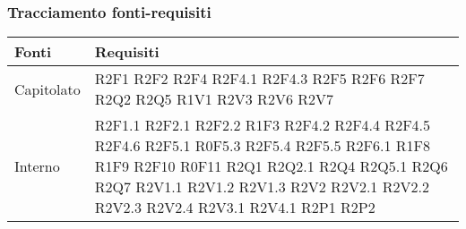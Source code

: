 \subsubsection{Tracciamento fonti-requisiti}
\begin{center}
	\centering
	\renewcommand{\arraystretch}{1.5}
	\begin{longtable}{  p{5cm} p{5cm} }
		\rowcolor{tableHeadYellow}
		\textbf{Fonti} & \textbf{Requisiti} \\
		\endhead  
		
		Capitolato & R2F1 \newline R2F2 \newline R2F4 \newline R2F4.1 \newline R2F4.3 \newline R2F5 \newline R2F6 \newline R2F7 \newline R2Q2 \newline R2Q5 \newline R1V1 \newline R2V3 \newline R2V6 \newline
					R2V7 \\
		Interno & R2F1.1 \newline R2F2.1 \newline R2F2.2 \newline R1F3 \newline R2F4.2 \newline R2F4.4 \newline R2F4.5 \newline R2F4.6 \newline R2F5.1 \newline R0F5.3 \newline R2F5.4 \newline R2F5.5 \newline R2F6.1 \newline R1F8 \newline R1F9 \newline R2F10 \newline R0F11 \newline R2Q1 \newline R2Q2.1 \newline R2Q4 \newline R2Q5.1 \newline R2Q6 \newline R2Q7 \newline R2V1.1 \newline R2V1.2 \newline R2V1.3 \newline R2V2 \newline R2V2.1 \newline R2V2.2 \newline R2V2.3 \newline R2V2.4 \newline R2V3.1 \newline R2V4.1 \newline R2P1 \newline R2P2 \\

\end{longtable}
\end{center}
